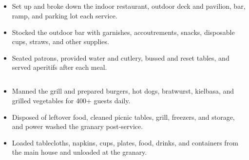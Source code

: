 \documentclass{article}
\newcommand{\subsubsectiontext}[1]{#1}
\begin{document}
\subsection{}
\subsubsectiontext{
    \begin{itemize}
        \item Set up and broke down the indoor restaurant, outdoor deck and pavilion, bar, ramp, and parking lot each service.
        \item Stocked the outdoor bar with garnishes, accoutrements, snacks, disposable cups, straws, and other supplies.
        \item Seated patrons, provided water and cutlery, bussed and reset tables, and served aperitifs after each meal.
    \end{itemize}
}

\subsection{}
\subsubsectiontext{
    \begin{itemize}
        \item Manned the grill and prepared burgers, hot dogs, bratwurst, kielbasa, and grilled vegetables for 400+ guests daily.
        \item Disposed of leftover food, cleaned picnic tables, grill, freezers, and storage, and power washed the granary post-service.
        \item Loaded tablecloths, napkins, cups, plates, food, drinks, and containers from the main house and unloaded at the granary.
    \end{itemize}
}
\end{document}

